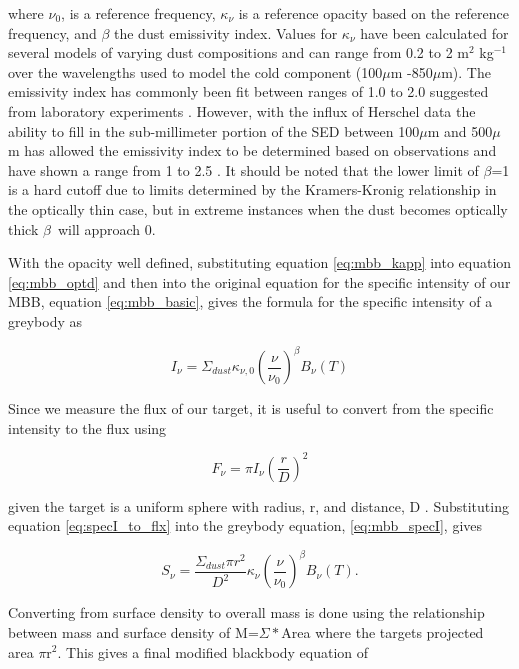 \noindent where $\nu_0$, is a reference frequency, $\kappa_{\nu}$ is a reference opacity based on the reference frequency, and $\beta$ the dust emissivity index.  Values for $\kappa_\nu$ have been calculated for several models of varying dust compositions and can range from 0.2 to 2 m$^2$ kg$^{-1}$ over the wavelengths used to model the cold component (100$\mu$m -850$\mu$m)\citep{li2001}.  The emissivity index has commonly been fit between ranges of 1.0 to 2.0  suggested from laboratory experiments \citep{walcher2011}.  However, with the influx of Herschel data the ability to fill in the sub-millimeter portion of the SED between 100$\mu$m and 500$\mu$m has allowed the emissivity index to be determined based on observations and have shown a range from 1 to 2.5 \citep{galametz2012}.  It should be noted that the lower limit of $\beta$=1 is a hard cutoff due to limits determined by the Kramers-Kronig relationship in the optically thin case\citep{li2005}, but in extreme instances when the dust becomes optically thick $\beta$\ will approach 0.

With the opacity well defined, substituting equation \ref{eq:mbb_kapp} into equation \ref{eq:mbb_optd} and then into the original equation for the specific intensity of our MBB, equation \ref{eq:mbb_basic}, gives the formula for the specific intensity of a greybody as

\begin{equation}\label{eq:mbb_specI}
  I_\nu=\Sigma_{dust}\kappa_{\nu,0}\left(\frac{\nu}{\nu_0}\right)^\beta B_\nu\left(T\right)
\end{equation}

\noindent  Since we measure the flux of our target, it is useful to convert from the specific intensity to the flux using 

\begin{equation}\label{specI_to_flx}
  F_\nu = \pi I_\nu \left(\frac{r}{D}\right)^2
\end{equation}

\noindent given the target is a uniform sphere with radius, r, and distance, D \citep{rybicki}.  Substituting equation \ref{eq:specI_to_flx} into the greybody equation, \ref{eq:mbb_specI}, gives

\begin{equation}\label{eq:mbb_sd}
  S_\nu=\frac{\Sigma_{dust}\pi r^2}{D^2}\kappa_\nu\left(\frac{\nu}{\nu_0}\right)^\beta B_\nu\left(T\right).
\end{equation}

Converting from surface density to overall mass is done using the relationship between mass and surface density of M=$\Sigma*$Area where the targets projected area $\pi$r$^2$.  This gives a final modified blackbody equation of 

